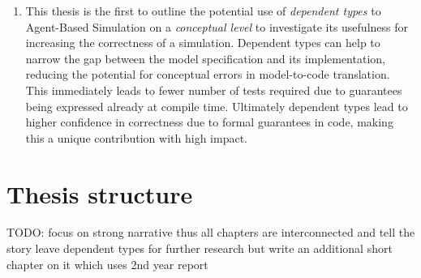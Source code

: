 \begin{enumerate}
	\item This thesis is the first to outline the potential use of \textit{dependent types} to Agent-Based Simulation on a \textit{conceptual level} to investigate its usefulness for increasing the correctness of a simulation. Dependent types can help to narrow the gap between the model specification and its implementation, reducing the potential for conceptual errors in model-to-code translation. This immediately leads to fewer number of tests required due to guarantees being expressed already at compile time. Ultimately dependent types lead to higher confidence in correctness due to formal guarantees in code, making this a unique contribution with high impact.
\end{enumerate}

\section{Thesis structure}
TODO: focus on strong narrative thus all chapters are interconnected and tell the story
leave dependent types for further research but write an additional short chapter on it which uses 2nd year report